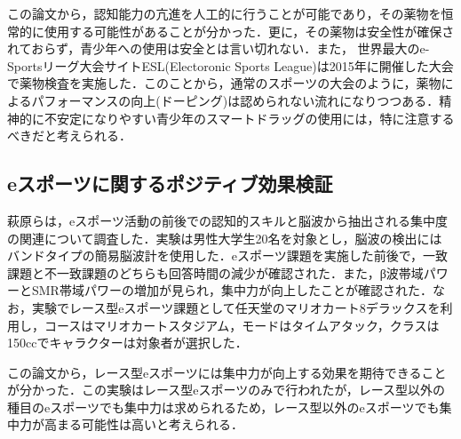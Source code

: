 この論文から，認知能力の亢進を人工的に行うことが可能であり，その薬物を恒常的に使用する可能性があることが分かった．更に，その薬物は安全性が確保されておらず，青少年への使用は安全とは言い切れない．また，
世界最大のe-Sportsリーグ大会サイトESL(Electoronic Sports League)は2015年に開催した大会で薬物検査を実施した．このことから，通常のスポーツの大会のように，薬物によるパフォーマンスの向上(ドーピング)は認められない流れになりつつある．精神的に不安定になりやすい青少年のスマートドラッグの使用には，特に注意するべきだと考えられる．

\subsection{eスポーツに関するポジティブ効果検証}

萩原らは，eスポーツ活動の前後での認知的スキルと脳波から抽出される集中度の関連について調査した\cite{Dentsu2019}．実験は男性大学生20名を対象とし，脳波の検出にはバンドタイプの簡易脳波計を使用した．eスポーツ課題を実施した前後で，一致課題と不一致課題のどちらも回答時間の減少が確認された．また，β波帯域パワーとSMR帯域パワーの増加が見られ，集中力が向上したことが確認された．なお，実験でレース型eスポーツ課題として任天堂のマリオカート8デラックスを利用し，コースはマリオカートスタジアム，モードはタイムアタック，クラスは150ccでキャラクターは対象者が選択した．

この論文から，レース型eスポーツには集中力が向上する効果を期待できることが分かった．この実験はレース型eスポーツのみで行われたが，レース型以外の種目のeスポーツでも集中力は求められるため，レース型以外のeスポーツでも集中力が高まる可能性は高いと考えられる．
